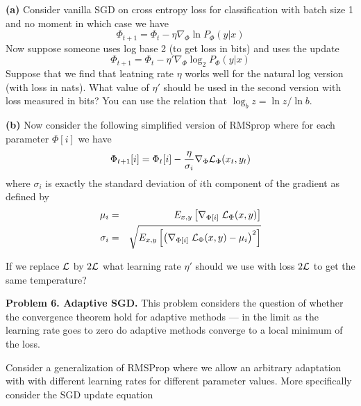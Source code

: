 \documentclass{article}
\newcommand{\solution}[1]{}
\begin{document}
{\bf (a)} Consider vanilla SGD on cross entropy loss for classification with batch size 1 and no moment in which case we have
$$\Phi_{t+1} = \Phi_t - \eta \nabla_\Phi \ln P_\Phi(y|x)$$
Now suppose someone uses log base 2 (to get loss in bits) and uses the update
$$\Phi_{t+1} = \Phi_t - \eta' \nabla_\Phi \log_2 P_\Phi(y|x)$$
Suppose that we find that leatning rate $\eta$ works well for the natural log version (with loss in nats).
What value of $\eta'$ should be used in the second version with loss measured in bits?
You can use the relation that $\log_b z = \ln z/\ln b$.

\solution{We have
  \begin{eqnarray*}
    - \Delta \Phi & = & \eta'\nabla_\Phi \log_2 P(\Phi) \\
    & = & \eta' \nabla_\Phi \ln P(\Phi)/\ln 2 \\
    & = & \frac{\eta'}{\ln 2} \nabla_\Phi \ln P(\Phi)
  \end{eqnarray*}
  To make the two updates the same we set $\eta' = \eta \ln 2$
  }

\medskip
    
{\bf (b)} Now consider the following simplified version of RMSprop where for each parameter $\Phi[i]$ we have
$$\Phi_{t+1}[i] = \Phi_t[i] - \frac{\eta}{\sigma_i} \nabla_\Phi {\cal L}_\Phi(x_t,y_t)$$
where $\sigma_i$ is exactly the standard deviation of $i$th component of the gradient as defined by
\begin{eqnarray*}
  \mu_i & = & E_{x,y}\left[\nabla_{\Phi[i]} \;{\cal L}_\Phi(x,y) \right] \\
  \sigma_i & = & \sqrt{E_{x,y}\left[\left(\nabla_{\Phi[i]} \;{\cal L}_\Phi(x,y) - \mu_i\right)^2\right]}
\end{eqnarray*}

If we replace ${\cal L}$ by $2{\cal L}$ what learning rate $\eta'$ should we use with loss $2{\cal L}$ to get the same temperature?

\solution{If we double the loss function we also double $\sigma_i$ and we have $\eta' = \eta$.  For RMSprop we get that the learning rate is (approximately) invariant
to scaling the loss function.  It is not clear whether this has any significance.}


\bigskip
{\bf Problem 6. Adaptive SGD.}  This problem considers the question of whether the convergence theorem hold for adaptive methods ---
in the limit as the learning rate goes to zero do adaptive methods converge to a local minimum of the loss.

Consider a generalization of RMSProp where we allow an arbitrary adaptation with with different learning rates for
different parameter values.  More specifically consider the SGD update equation
\end{document}
